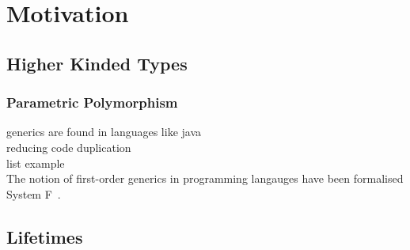 \chapter{Motivation}\label{sec:background}

\section{Higher Kinded Types}

\subsection{Parametric Polymorphism}
generics are found in languages like java \\
reducing code duplication \\

list example \\

The notion of first-order generics in programming langauges have been formalised
System F~\cite{higher}. 


\section{Lifetimes}

